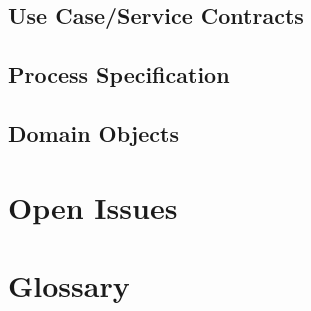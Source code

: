 \documentclass[a4paper]{article}
\begin{document}
		\subsection{Use Case/Service Contracts}

		\subsection{Process Specification}

		\subsection{Domain Objects}

	\section{Open Issues}

	\section{Glossary}
\end{document}
